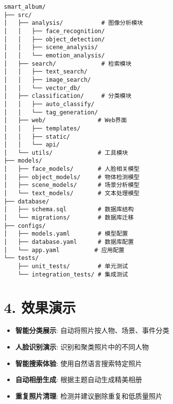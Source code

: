 \begin{lstlisting}
smart_album/
├── src/
│   ├── analysis/           # 图像分析模块
│   │   ├── face_recognition/
│   │   ├── object_detection/
│   │   ├── scene_analysis/
│   │   └── emotion_analysis/
│   ├── search/             # 检索模块
│   │   ├── text_search/
│   │   ├── image_search/
│   │   └── vector_db/
│   ├── classification/     # 分类模块
│   │   ├── auto_classify/
│   │   └── tag_generation/
│   ├── web/               # Web界面
│   │   ├── templates/
│   │   ├── static/
│   │   └── api/
│   └── utils/             # 工具模块
├── models/
│   ├── face_models/       # 人脸相关模型
│   ├── object_models/     # 物体检测模型
│   ├── scene_models/      # 场景分析模型
│   └── text_models/       # 文本处理模型
├── database/
│   ├── schema.sql         # 数据库结构
│   └── migrations/        # 数据库迁移
├── configs/
│   ├── models.yaml        # 模型配置
│   ├── database.yaml      # 数据库配置
│   └── app.yaml          # 应用配置
└── tests/
    ├── unit_tests/        # 单元测试
    └── integration_tests/ # 集成测试
\end{lstlisting}

\section{4. 效果演示}\label{ux6548ux679cux6f14ux793a}

\begin{itemize}
\tightlist
\item
  \textbf{智能分类展示}: 自动将照片按人物、场景、事件分类
\item
  \textbf{人脸识别演示}: 识别和聚类照片中的不同人物
\item
  \textbf{智能搜索体验}: 使用自然语言搜索特定照片
\item
  \textbf{自动相册生成}: 根据主题自动生成精美相册
\item
  \textbf{重复照片清理}: 检测并建议删除重复和低质量照片
\end{itemize}
